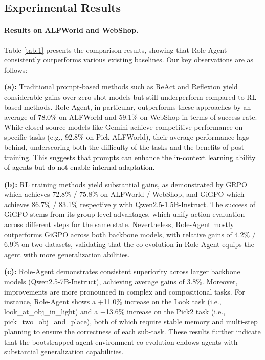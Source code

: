 \documentclass[11pt]{article}
\begin{document}
\subsection{Experimental Results}
\paragraph{Results on ALFWorld and WebShop.}
Table \ref{tab:1} presents the comparison results, showing that Role-Agent consistently outperforms various existing baselines. Our key observations are as follows:



\textbf{(a):} Traditional prompt-based methods such as ReAct and Reflexion yield considerable gains over zero-shot models but still underperform compared to RL-based methods. Role-Agent, in particular, outperforms these approaches by an average of 78.0\% on ALFWorld and 59.1\% on WebShop in terms of success rate. While closed-source models like Gemini achieve competitive performance on specific tasks (e.g., 92.8\% on Pick-ALFWorld), their average performance lags behind, underscoring both the difficulty of the tasks and the benefits of post-training. \textcolor{black}{This suggests that prompts can enhance the in-context learning ability of agents but do not enable internal adaptation.}



\textbf{(b):} RL training methods yield substantial gains, as demonstrated by GRPO  which achieves 72.8\% / 75.8\% on ALFWorld / WebShop, and GiGPO which achieves 86.7\% / 83.1\% respectively with Qwen2.5-1.5B-Instruct. The success of GiGPO stems from its group-level advantages, which unify action evaluation across different steps for the same state. Nevertheless, Role-Agent mostly outperforms GiGPO across both backbone models, with relative gains of 4.2\% / 6.9\% on two datasets, validating that the co-evolution in Role-Agent equips the agent with more generalization abilities.  

\textbf{(c):} Role-Agent demonstrates consistent superiority across larger backbone models (Qwen2.5-7B-Instruct), achieving average gains of 3.8\%. Moreover, improvements are more pronounced in complex and compositional tasks. For instance, Role-Agent shows a +11.0\% increase on the Look task (i.e., look\_at\_obj\_in\_light) and a +13.6\% increase on the Pick2 task (i.e., pick\_two\_obj\_and\_place), both of which require stable memory and multi-step planning to ensure the correctness of each sub-task. These results further indicate that the bootstrapped agent-environment co-evolution endows agents with substantial generalization capabilities.
\end{document}
